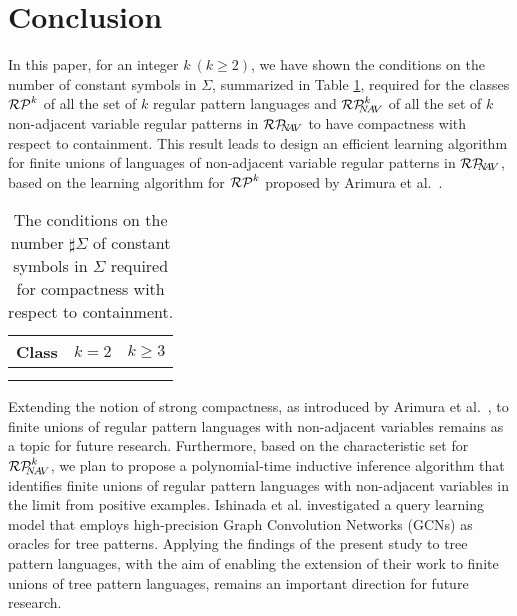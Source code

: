 \section{Conclusion}
In this paper, for an integer $k~(k\ge 2)$, we have shown the conditions on the number of constant symbols in $\Sigma$, summarized in Table \ref{table:results}, required for the classes $\RPatkei$ of all the set of $k$ regular pattern languages and $\NAVRPkei$ of all the set of $k$ non-adjacent variable regular patterns in $\mathcal{RP}_{\!\!\!N\!\!A\!V}$ to have compactness with respect to containment.
This result leads to design an efficient learning algorithm for finite unions of languages of non-adjacent variable regular patterns in $\mathcal{RP}_{\!\!\!N\!\!A\!V}$, based on the learning algorithm for $\RPatkei$ proposed by Arimura et al.~\cite{Arimura1994}.
\begin{table}
\caption{The conditions on the number $\sharp \Sigma$ of constant symbols in $\Sigma$ required for compactness with respect to containment.}\label{table:results}
\begin{center}
\begin{tabular}{c|c|c}
  Class & $k=2$ & $k\ge 3$\\
  \hline
  \raisebox{-5pt}{$\RPatkei$} & \raisebox{-5pt}{$\sharp \Sigma \ge 4$} & \raisebox{-5pt}{$\sharp \Sigma \ge 2k-1$} \\[10pt]
  \hline
  \raisebox{-5pt}{$\NAVRPkei$} & \multicolumn{2}{c}{\raisebox{-5pt}{$\sharp \Sigma \ge k+2$}}\\[10pt]
\end{tabular}
\end{center}
\vspace*{-10pt}
\end{table}

Extending the notion of strong compactness, as introduced by Arimura et al.~\cite{Arimura1996}, to finite unions of regular pattern languages with non-adjacent variables remains as a topic for future research.
Furthermore, based on the characteristic set for $\NAVRPkei$, we plan to propose a polynomial-time inductive inference algorithm that identifies finite unions of regular pattern languages with non-adjacent variables in the limit from positive examples.
Ishinada et al. \cite{Ishinada2023} investigated a query learning model that employs high-precision Graph Convolution Networks (GCNs) as oracles for tree patterns.
Applying the findings of the present study to tree pattern languages, with the aim of enabling the extension of their work to finite unions of tree pattern languages, remains an important direction for future research.